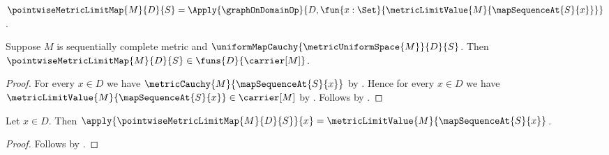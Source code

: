 \begin{definition}\label{pointwise_metric_limit_map}
    $\pointwiseMetricLimitMap{M}{D}{S}=\Apply{\graphOnDomainOp}
        {D,\fun{x:\Set}{\metricLimitValue{M}{\mapSequenceAt{S}{x}}}}$.
\end{definition}

\begin{proposition}\label{pointwise_metric_limit_map_typed}
    Suppose $M$ is sequentially complete metric and
        $\uniformMapCauchy{\metricUniformSpace{M}}{D}{S}$.
    Then $\pointwiseMetricLimitMap{M}{D}{S}
        \in\funs{D}{\carrier[M]}$.
\end{proposition}
\begin{proof}
    For every $x\in D$ we have
        $\metricCauchy{M}{\mapSequenceAt{S}{x}}$
        by .
    Hence for every $x\in D$ we have
        $\metricLimitValue{M}{\mapSequenceAt{S}{x}}\in\carrier[M]$
        by .
    Follows by
        .
\end{proof}

\begin{proposition}\label{pointwise_metric_limit_map_apply}
    Let $x\in D$.
    Then $\apply{\pointwiseMetricLimitMap{M}{D}{S}}{x}
        =\metricLimitValue{M}{\mapSequenceAt{S}{x}}$.
\end{proposition}
\begin{proof}
    Follows by
        .
\end{proof}

